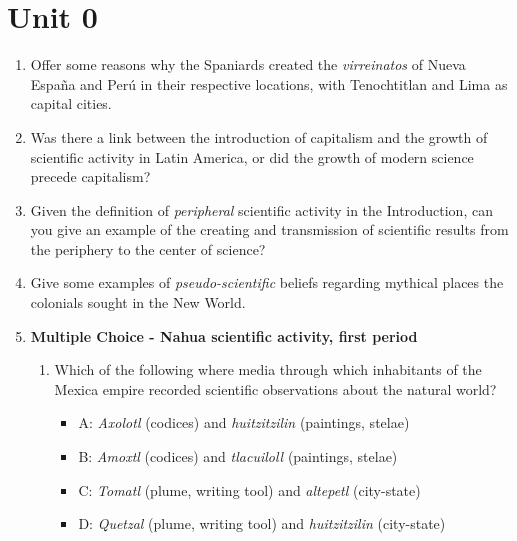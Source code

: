 \documentclass[10pt]{article}
\begin{document}
\maketitle

\section{Unit 0}

\begin{enumerate}
\item Offer some reasons why the Spaniards created the \textit{virreinatos} of Nueva Espa\~{n}a and Per\'{u} in their respective locations, with Tenochtitlan and Lima as capital cities. \\ \vspace{1cm}
\item Was there a link between the introduction of capitalism and the growth of scientific activity in Latin America, or did the growth of modern science precede capitalism? \\ \vspace{0.5cm}
\item Given the definition of \textit{peripheral} scientific activity in the Introduction, can you give an example of the creating and transmission of scientific results from the periphery to the center of science? \\ \vspace{1cm}
\item Give some examples of \textit{pseudo-scientific} beliefs regarding mythical places the colonials sought in the New World. \\ \vspace{1cm}
\item \textbf{Multiple Choice - Nahua scientific activity, first period}
\begin{enumerate}
\item Which of the following where media through which inhabitants of the Mexica empire recorded scientific observations about the natural world?
\begin{itemize}
\item A: \textit{Axolotl} (codices) and \textit{huitzitzilin} (paintings, stelae)
\item B: \textit{Amoxtl} (codices) and \textit{tlacuiloll} (paintings, stelae)
\item C: \textit{Tomatl} (plume, writing tool) and \textit{altepetl} (city-state)
\item D: \textit{Quetzal} (plume, writing tool) and \textit{huitzitzilin} (city-state)

\end{itemize}
\end{enumerate}
\end{enumerate}
\end{document}
